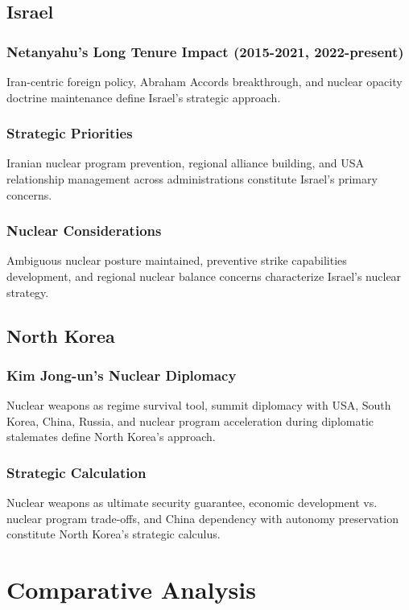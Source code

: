 \documentclass[a4paper, 11pt]{article}
\begin{document}
\subsection{Israel}

\subsubsection{Netanyahu's Long Tenure Impact (2015-2021, 2022-present)}
Iran-centric foreign policy, Abraham Accords breakthrough, and nuclear opacity doctrine maintenance define Israel's strategic approach.

\subsubsection{Strategic Priorities}
Iranian nuclear program prevention, regional alliance building, and USA relationship management across administrations constitute Israel's primary concerns.

\subsubsection{Nuclear Considerations}
Ambiguous nuclear posture maintained, preventive strike capabilities development, and regional nuclear balance concerns characterize Israel's nuclear strategy.

\subsection{North Korea}

\subsubsection{Kim Jong-un's Nuclear Diplomacy}
Nuclear weapons as regime survival tool, summit diplomacy with USA, South Korea, China, Russia, and nuclear program acceleration during diplomatic stalemates define North Korea's approach.

\subsubsection{Strategic Calculation}
Nuclear weapons as ultimate security guarantee, economic development vs. nuclear program trade-offs, and China dependency with autonomy preservation constitute North Korea's strategic calculus.

\section{Comparative Analysis}
\end{document}
